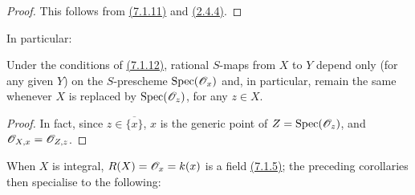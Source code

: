 \begin{proof}
\label{proof-1.7.1.13}
This follows from \hyperref[1.7.1.11]{(7.1.11)} and \hyperref[1.2.4.4]{(2.4.4)}.
\end{proof}

In particular:
\begin{cor}[7.1.14]
\label{1.7.1.14}
Under the conditions of \hyperref[1.7.1.12]{(7.1.12)}, rational $S$-maps from $X$ to $Y$ depend only (for any given $Y$) on the $S$-prescheme ${\mathop{\mathrm{Spec}}\nolimits}(\mathscr{O}_x)$ and, in particular, remain the same whenever $X$ is replaced by ${\mathop{\mathrm{Spec}}\nolimits}(\mathscr{O}_z)$, for any $z\in X$.
\end{cor}

\begin{proof}
\label{proof-1.7.1.14}
In fact, since $z\in\overline{\{x\}}$, $x$ is the generic point of $Z={\mathop{\mathrm{Spec}}\nolimits}(\mathscr{O}_z)$, and $\mathscr{O}_{X,x}=\mathscr{O}_{Z,z}$.
\end{proof}

When $X$ is integral, $R(X)=\mathscr{O}_x=k(x)$ is a field \hyperref[1.7.1.5]{(7.1.5)}; the preceding corollaries then specialise to the following:

\begin{cor}[7.1.15]
\label{1.7.1.15}
\end{cor}
